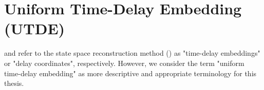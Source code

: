 \section{Uniform Time-Delay Embedding (UTDE)}\label{sec:utimedelayembedding}

\cite{frank2010} and \cite{sama2013} refer to the state space reconstruction method
(\cite{takens1981, casdagli1991}) as "time-delay embeddings" or "delay coordinates", respectively.
However, we consider the term "uniform time-delay embedding"
as more descriptive and appropriate terminology for this thesis.

